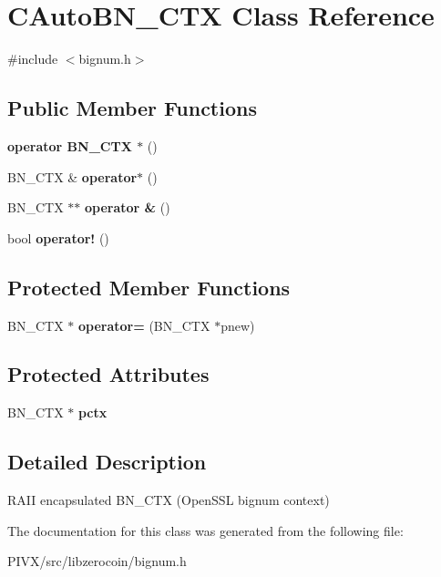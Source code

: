 \hypertarget{class_c_auto_b_n___c_t_x}{}\section{C\+Auto\+B\+N\+\_\+\+C\+TX Class Reference}
\label{class_c_auto_b_n___c_t_x}


{\ttfamily \#include $<$bignum.\+h$>$}

\subsection*{Public Member Functions}
\begin{DoxyCompactItemize}
\item 
\mbox{\label{class_c_auto_b_n___c_t_x_a17f28434d1ddfb3133ba34aaa73d44b4}} 
{\bfseries operator B\+N\+\_\+\+C\+T\+X $\ast$} ()
\item 
\mbox{\label{class_c_auto_b_n___c_t_x_a3850675de213c20d764575850a37ddfd}} 
B\+N\+\_\+\+C\+TX \& {\bfseries operator$\ast$} ()
\item 
\mbox{\label{class_c_auto_b_n___c_t_x_a5cb1e357f7d9f6ae1a58d4fe760757ad}} 
B\+N\+\_\+\+C\+TX $\ast$$\ast$ {\bfseries operator \&} ()
\item 
\mbox{\label{class_c_auto_b_n___c_t_x_a33c967d143efcbfafcac9f863fce1d4f}} 
bool {\bfseries operator!} ()
\end{DoxyCompactItemize}
\subsection*{Protected Member Functions}
\begin{DoxyCompactItemize}
\item 
\mbox{\label{class_c_auto_b_n___c_t_x_a954a9a333d2041861500e5cb471fa8f6}} 
B\+N\+\_\+\+C\+TX $\ast$ {\bfseries operator=} (B\+N\+\_\+\+C\+TX $\ast$pnew)
\end{DoxyCompactItemize}
\subsection*{Protected Attributes}
\begin{DoxyCompactItemize}
\item 
\mbox{\label{class_c_auto_b_n___c_t_x_a264ef42b71cb55111928fce1aa4d9ad3}} 
B\+N\+\_\+\+C\+TX $\ast$ {\bfseries pctx}
\end{DoxyCompactItemize}


\subsection{Detailed Description}
R\+A\+II encapsulated B\+N\+\_\+\+C\+TX (Open\+S\+SL bignum context) 

The documentation for this class was generated from the following file\+:\begin{DoxyCompactItemize}
\item 
P\+I\+V\+X/src/libzerocoin/bignum.\+h\end{DoxyCompactItemize}
